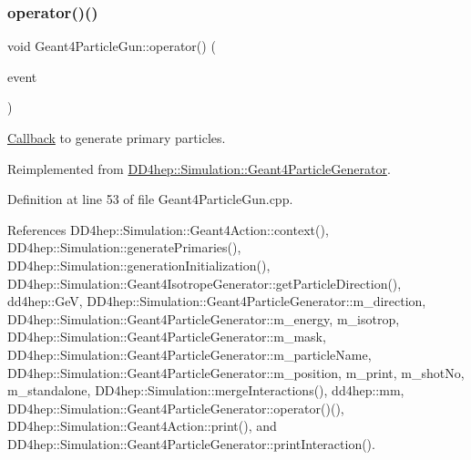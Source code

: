 \hypertarget{class_d_d4hep_1_1_simulation_1_1_geant4_particle_gun_a4e68905424d21f2386d24d3cbaf795f1}{}\label{class_d_d4hep_1_1_simulation_1_1_geant4_particle_gun_a4e68905424d21f2386d24d3cbaf795f1} 
\subsubsection{\texorpdfstring{operator()()}{operator()()}}
{\footnotesize\ttfamily void Geant4\+Particle\+Gun\+::operator() (\begin{DoxyParamCaption}\item[{G4\+Event $\ast$}]{event }\end{DoxyParamCaption})\hspace{0.3cm}{\ttfamily [virtual]}}



\hyperlink{class_d_d4hep_1_1_callback}{Callback} to generate primary particles. 



Reimplemented from \hyperlink{class_d_d4hep_1_1_simulation_1_1_geant4_particle_generator_a4b7c8fdbc6fdc0c79efdf112c8ede315}{D\+D4hep\+::\+Simulation\+::\+Geant4\+Particle\+Generator}.



Definition at line 53 of file Geant4\+Particle\+Gun.\+cpp.



References D\+D4hep\+::\+Simulation\+::\+Geant4\+Action\+::context(), D\+D4hep\+::\+Simulation\+::generate\+Primaries(), D\+D4hep\+::\+Simulation\+::generation\+Initialization(), D\+D4hep\+::\+Simulation\+::\+Geant4\+Isotrope\+Generator\+::get\+Particle\+Direction(), dd4hep\+::\+GeV, D\+D4hep\+::\+Simulation\+::\+Geant4\+Particle\+Generator\+::m\+\_\+direction, D\+D4hep\+::\+Simulation\+::\+Geant4\+Particle\+Generator\+::m\+\_\+energy, m\+\_\+isotrop, D\+D4hep\+::\+Simulation\+::\+Geant4\+Particle\+Generator\+::m\+\_\+mask, D\+D4hep\+::\+Simulation\+::\+Geant4\+Particle\+Generator\+::m\+\_\+particle\+Name, D\+D4hep\+::\+Simulation\+::\+Geant4\+Particle\+Generator\+::m\+\_\+position, m\+\_\+print, m\+\_\+shot\+No, m\+\_\+standalone, D\+D4hep\+::\+Simulation\+::merge\+Interactions(), dd4hep\+::mm, D\+D4hep\+::\+Simulation\+::\+Geant4\+Particle\+Generator\+::operator()(), D\+D4hep\+::\+Simulation\+::\+Geant4\+Action\+::print(), and D\+D4hep\+::\+Simulation\+::\+Geant4\+Particle\+Generator\+::print\+Interaction().



